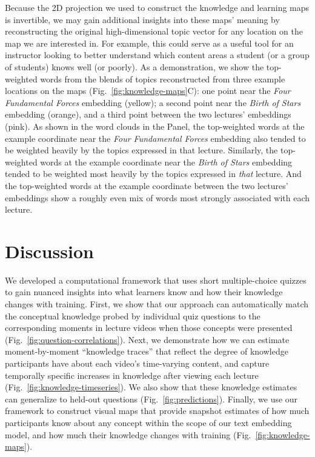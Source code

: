 \documentclass[10pt]{article}
\begin{document}
Because the 2D projection we used to construct the knowledge and learning maps
is invertible, we may gain additional insights into these maps' meaning
by reconstructing the original high-dimensional topic vector for any location
on the map we are interested in. For example, this could serve as a useful
tool for an instructor looking to better understand which content areas a
student (or a group of students) knows well (or poorly). As a demonstration, we
show the top-weighted words from the blends of topics reconstructed from three
example locations on the maps (Fig.~\ref{fig:knowledge-maps}C): one point near
the \textit{Four Fundamental Forces} embedding (yellow); a second point near
the \textit{Birth of Stars} embedding (orange), and a third point
between the two lectures' embeddings (pink). As shown in the word clouds in the
Panel, the top-weighted words at the example coordinate near the \textit{Four
Fundamental Forces} embedding also tended to be weighted heavily by the topics
expressed in that lecture. Similarly, the top-weighted words at the example
coordinate near the \textit{Birth of Stars} embedding tended to be weighted
most heavily by the topics expressed in \textit{that} lecture. And the
top-weighted words at the example coordinate between the two lectures'
embeddings show a roughly even mix of words most strongly associated with each
lecture.

\section*{Discussion}

We developed a computational framework that uses short multiple-choice quizzes
to gain nuanced insights into what learners know and how their knowledge
changes with training. First, we show that our approach can automatically match
the conceptual knowledge probed by individual quiz questions to the corresponding
moments in lecture videos when those concepts were presented
(Fig.~\ref{fig:question-correlations}). Next, we demonstrate how we can
estimate moment-by-moment ``knowledge traces'' that reflect the degree of knowledge
participants have about each video's time-varying content, and capture temporally
specific increases in knowledge after viewing each lecture (Fig.~\ref{fig:knowledge-timeseries}).
 We also show that these knowledge estimates can generalize to held-out questions
(Fig.~\ref{fig:predictions}). Finally, we use our framework to construct visual
maps that provide snapshot estimates of how much participants know about any
concept within the scope of our text embedding model, and how much their
knowledge changes with training (Fig.~\ref{fig:knowledge-maps}).
\end{document}
